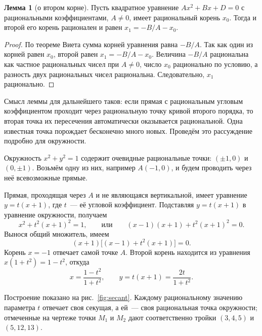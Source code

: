 \documentclass[a4paper,14pt]{extreport}
\theoremstyle{definition}
\newtheorem{lem}[thm]{Лемма}
\begin{document}
\begin{lem}[о втором корне]\label{lem:root}
Пусть квадратное уравнение $Ax^2+Bx+D=0$ с рациональными коэффициентами,
$A\neq 0$, имеет рациональный корень $x_0$. Тогда и второй его корень
рационален и равен $x_1=-B/A-x_0$.
\end{lem}

\begin{proof}
По теореме Виета сумма корней уравнения равна $-B/A$. Так как один из корней
равен $x_0$, второй равен $x_1=-B/A-x_0$. Величина $-B/A$ рациональна как
частное рациональных чисел при $A\neq 0$, число $x_0$ рационально по условию,
а разность двух рациональных чисел рациональна. Следовательно, $x_1$
рационально.
\end{proof}

Смысл леммы для дальнейшего таков: если прямая с рациональным угловым
коэффициентом проходит через рациональную точку кривой второго порядка, то
вторая точка их пересечения автоматически оказывается рациональной. Одна
известная точка порождает бесконечно много новых. Проведём это рассуждение
подробно для окружности.

Окружность $x^2+y^2=1$ содержит очевидные рациональные точки: $(\pm1,0)$ и
$(0,\pm1)$. Возьмём одну из них, например $A(-1,0)$, и будем проводить через
неё всевозможные прямые.

Прямая, проходящая через $A$ и не являющаяся вертикальной, имеет уравнение
$y=t(x+1)$, где $t$~--- её угловой коэффициент. Подставляя $y=t(x+1)$ в
уравнение окружности, получаем
\[
  x^2+t^2(x+1)^2=1,\qquad\text{или}\qquad (x-1)(x+1)+t^2(x+1)^2=0 .
\]
Вынося общий множитель, имеем
\[
  (x+1)\bigl[(x-1)+t^2(x+1)\bigr]=0 .
\]
Корень $x=-1$ отвечает самой точке $A$. Второй корень находится из уравнения
$x(1+t^2)=1-t^2$, откуда
\begin{equation}\label{eq:circle}
  x=\frac{1-t^2}{1+t^2},\qquad y=t(x+1)=\frac{2t}{1+t^2}.
\end{equation}

Построение показано на рис.~\ref{fig:secant}. Каждому рациональному значению
параметра $t$ отвечает своя секущая, а ей~--- своя рациональная точка
окружности; отмеченные на чертеже точки $M_1$ и $M_2$ дают соответственно
тройки $(3,4,5)$ и $(5,12,13)$.
\end{document}
